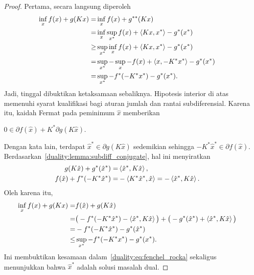 \begin{proof}
    Pertama, secara langsung diperoleh
    \begin{equation}\label{duality:eq:fenchel_rocka}
        \begin{aligned}
            \inf_{x} f(x) + g(Kx)
            =& \inf_{x} f(x) + g^{**}(Kx)\\
            =& \inf_{x}\sup_{x^*} f(x) + \left\langle Kx , x^*\right\rangle - g^*(x^*)\\
            \geq & \sup_{x^*} \inf_{x} f(x) + \left\langle Kx , x^*\right\rangle - g^*(x^*)\\
            = & \sup_{x^*} -\sup_{x} -f(x) + \left\langle x , -K^*x^*\right\rangle - g^*(x^*)\\
            = & \sup_{x^*} -f^*(-K^*x^*) - g^*(x^*).
        \end{aligned}
    \end{equation}
    Jadi, tinggal dibuktikan ketaksamaan sebaliknya.
    Hipotesis interior di atas memenuhi syarat kualifikasi bagi aturan jumlah dan rantai subdiferensial. Karena itu, kaidah Fermat pada peminimum $\hat x$ memberikan
    \par\smallskip
    {\centering $\displaystyle 0 \in \partial f(\hat x) + K^*\partial g(K\hat x)$.\par}
    \smallskip\noindent
    Dengan kata lain, terdapat $\hat x^*\in \partial g(K\hat x)$ sedemikian sehingga $-K^*\hat x^*\in \partial f (\hat x)$. Berdasarkan~\cref{duality:lemma:subdiff_conjugate}, hal ini menyiratkan
    \begin{equation}
        \begin{aligned}
            g(K\hat x) + g^*(\hat x^*) =& \left\langle\hat x^* , K\hat x\right\rangle,\\
            f(\hat x) + f^*(-K^*\hat x^*)
            =& -\left\langle K^*\hat x^* , \hat x\right\rangle = -\left\langle\hat x^* , K\hat x\right\rangle.
        \end{aligned}
    \end{equation}
    Oleh karena itu,
    \begin{equation}
        \begin{aligned}
            \inf_x f(x) + g(Kx)
            =& f(\hat x) + g(K\hat x) \\
            =& \big(-f^*(-K^*\hat x^*) - \left\langle\hat x^* , K\hat x\right\rangle\big) + \big(-g^*(\hat x^*) + \left\langle\hat x^* , K\hat x\right\rangle\big)\\
            =& -f^*(-K^*\hat x^*) -g^*(\hat x^*)\\
            \leq& \sup_{x^*} -f^*(-K^*x^*) - g^*(x^*).
        \end{aligned}
    \end{equation}
    Ini membuktikan kesamaan dalam~\eqref{duality:eq:fenchel_rocka} sekaligus menunjukkan bahwa $\hat x^*$ adalah solusi masalah dual.
\end{proof}
